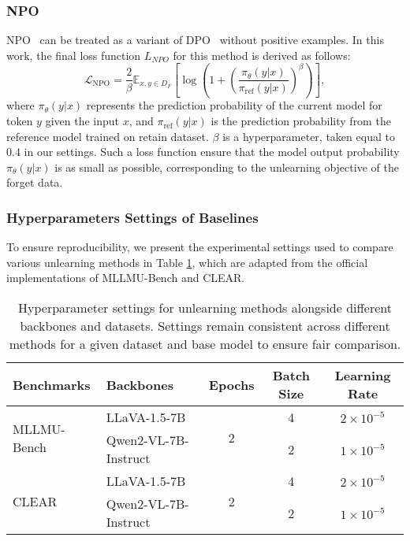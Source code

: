 \subsubsection{NPO}
NPO~\cite{zhang2024npo} can be treated as a variant of DPO~\cite{rafailov2024dpo} without positive examples. In this work, the final loss function $L_{NPO}$ for this method is derived as follows:
\begin{equation}
    \mathcal{L}_\text{NPO}=\frac{2}{\beta} \mathbb{E}_{x,y \in D_F} \left[ \log \left( 1 + \left( \frac{\pi_{\theta}(y|x)}{\pi_{\text{ref}}(y|x)} \right)^{\beta} \right) \right],
\end{equation}
where $\pi_{\theta}(y|x)$ represents the prediction probability of the current model for token $y$ given the input $x$, and $\pi_{\text{ref}}(y|x)$ is the prediction probability from the reference model trained on retain dataset. $\beta$ is a hyperparameter, taken equal to 0.4 in our settings. Such a loss function ensure that the model output probability $\pi_{\theta}(y|x)$ is as small as possible, corresponding to the unlearning objective of the forget data.

\subsubsection{Hyperparameters Settings of Baselines}\label{app:base_hyper}
To ensure reproducibility, we present the experimental settings used to compare various unlearning methods in Table \ref{tab:baselines}, which are adapted from the official implementations of MLLMU-Bench and CLEAR.
\begin{table}[h]
    \centering
    \begin{tabular}{|l|l|c|c|c|}
        \hline
        \textbf{Benchmarks} & \textbf{Backbones} & Epochs & Batch Size & Learning Rate \\
        \hline
        \multirow{2}{*}{MLLMU-Bench} & LLaVA-1.5-7B & \multirow{2}{*}{2} & 4 & $2 \times 10^{-5}$ \\
        & Qwen2-VL-7B-Instruct &  & 2 & $1 \times 10^{-5}$ \\
        \hline
        \multirow{2}{*}{CLEAR} & LLaVA-1.5-7B & \multirow{2}{*}{2} & 4 & $2 \times 10^{-5}$ \\
        & Qwen2-VL-7B-Instruct &  & 2 & $1 \times 10^{-5}$ \\
        \hline
    \end{tabular}
    \caption{Hyperparameter settings for unlearning methods alongside different backbones and datasets. Settings remain consistent across different methods for a given dataset and base model to ensure fair comparison.}
    \label{tab:baselines}
\end{table}







